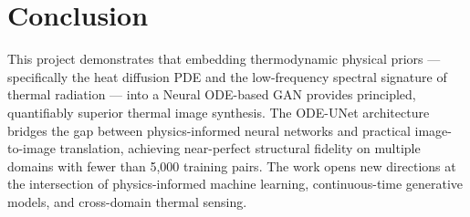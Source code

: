 \section{Conclusion}

This project demonstrates that embedding thermodynamic physical priors — specifically the heat diffusion PDE and the low-frequency spectral signature of thermal radiation — into a Neural ODE-based GAN provides principled, quantifiably superior thermal image synthesis. The ODE-UNet architecture bridges the gap between physics-informed neural networks and practical image-to-image translation, achieving near-perfect structural fidelity on multiple domains with fewer than 5,000 training pairs. The work opens new directions at the intersection of physics-informed machine learning, continuous-time generative models, and cross-domain thermal sensing.